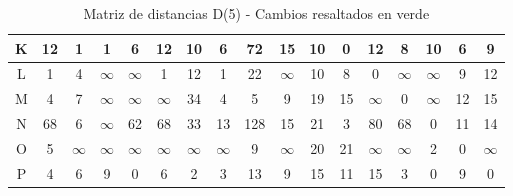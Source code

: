 \documentclass[12pt]{article}
\begin{document}
\begin{table}[h!]
\begin{tabular}{|c|c|c|c|c|c|c|c|c|c|c|c|c|c|c|c|c|}
K & \cellcolor{lightgreen} 12 & 1 & 1 & 6 & 12 & 10 & 6 & 72 & 15 & 10 & 0 & 12 & 8 & 10 & 6 & 9 \\\hline
L & \cellcolor{lightgreen} 1 & 4 & $\infty$ & $\infty$ & 1 & \cellcolor{lightgreen} 12 & 1 & 22 & $\infty$ & \cellcolor{lightgreen} 10 & \cellcolor{lightgreen} 8 & 0 & $\infty$ & $\infty$ & 9 & 12 \\\hline
M & 4 & 7 & $\infty$ & $\infty$ & $\infty$ & 34 & 4 & 5 & 9 & 19 & 15 & $\infty$ & 0 & $\infty$ & 12 & 15 \\\hline
N & \cellcolor{lightgreen} 68 & 6 & $\infty$ & 62 & 68 & 33 & 13 & 128 & 15 & 21 & 3 & \cellcolor{lightgreen} 80 & 68 & 0 & 11 & 14 \\\hline
O & 5 & $\infty$ & $\infty$ & $\infty$ & $\infty$ & $\infty$ & $\infty$ & 9 & $\infty$ & 20 & 21 & $\infty$ & $\infty$ & 2 & 0 & $\infty$ \\\hline
P & 4 & 6 & 9 & 0 & 6 & 2 & 3 & 13 & 9 & \cellcolor{lightgreen} 15 & 11 & 15 & 3 & 0 & 9 & 0 \\\hline
\end{tabular}
\caption{Matriz de distancias D(5) - Cambios resaltados en verde}
\end{table}
\end{document}

